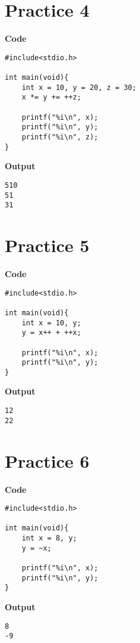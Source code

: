 \documentclass[a4paper, 11pt]{article}
\begin{document}
    \section*{Practice 4}
    \begin{minipage}[t]{0.5\textwidth}
        \large \textbf{Code}
        \begin{lstlisting}[style=code]
#include<stdio.h>

int main(void){
    int x = 10, y = 20, z = 30;
    x *= y += ++z;

    printf("%i\n", x);
    printf("%i\n", y);
    printf("%i\n", z);
}
        \end{lstlisting}
    \end{minipage}
    \hspace{0.5cm}
    \begin{minipage}[t]{0.5\textwidth}
        \large \textbf{Output}
        \begin{lstlisting}[style=output]
510
51
31
        \end{lstlisting}
    \end{minipage}
    \section*{Practice 5}
    \begin{minipage}[t]{0.5\textwidth}
        \large \textbf{Code}
        \begin{lstlisting}[style=code]
#include<stdio.h>

int main(void){
    int x = 10, y;
    y = x++ + ++x;

    printf("%i\n", x);
    printf("%i\n", y);
}
        \end{lstlisting}
    \end{minipage}
    \hspace{0.5cm}
    \begin{minipage}[t]{0.5\textwidth}
        \large \textbf{Output}
        \begin{lstlisting}[style=output]
12
22
        \end{lstlisting}
    \end{minipage}

    \section*{Practice 6}
    \begin{minipage}[t]{0.5\textwidth}
        \large \textbf{Code}
        \begin{lstlisting}[style=code]
#include<stdio.h>

int main(void){
    int x = 8, y;
    y = ~x;

    printf("%i\n", x);
    printf("%i\n", y);
}
        \end{lstlisting}
    \end{minipage}
    \hspace{0.5cm}
    \begin{minipage}[t]{0.5\textwidth}
        \large \textbf{Output}
        \begin{lstlisting}[style=output]
8
-9
        \end{lstlisting}
    \end{minipage}
\end{document}
